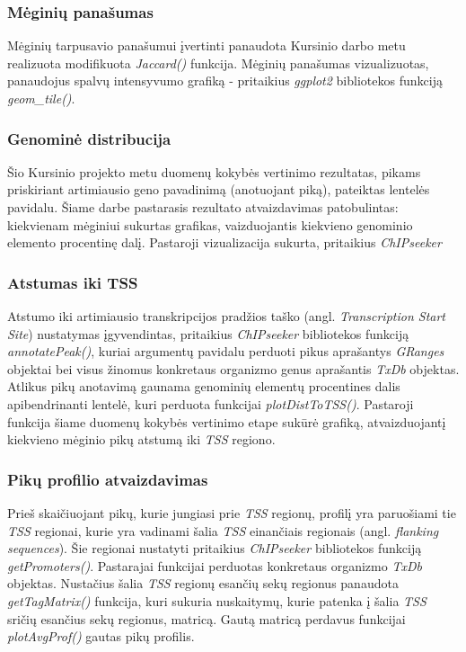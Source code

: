 \documentclass[12pt]{article}
\begin{document}
\subsubsection*{Mėginių panašumas}
Mėginių tarpusavio panašumui įvertinti panaudota Kursinio darbo metu
realizuota modifikuota \emph{Jaccard()} funkcija. Mėginių panašumas
vizualizuotas, panaudojus spalvų intensyvumo grafiką - pritaikius \emph{ggplot2}
bibliotekos funkciją \emph{geom\_tile()}.

\subsubsection*{Genominė distribucija}
Šio Kursinio projekto metu duomenų kokybės vertinimo rezultatas, pikams
priskiriant artimiausio geno pavadinimą (anotuojant piką), pateiktas
lentelės pavidalu. Šiame darbe pastarasis rezultato atvaizdavimas patobulintas:
kiekvienam mėginiui sukurtas grafikas, vaizduojantis kiekvieno genominio
elemento procentinę dalį. Pastaroji vizualizacija sukurta, pritaikius
\emph{ChIPseeker}\cite{CHIPSEEKER}

\subsubsection*{Atstumas iki TSS}
Atstumo iki artimiausio transkripcijos pradžios taško
(angl. \emph{Transcription Start Site}) nustatymas įgyvendintas, pritaikius
\emph{ChIPseeker} bibliotekos funkciją \emph{annotatePeak()}, kuriai argumentų
pavidalu perduoti pikus aprašantys \emph{GRanges} objektai bei visus žinomus
konkretaus organizmo genus aprašantis \emph{TxDb} objektas. Atlikus pikų
anotavimą gaunama genominių elementų procentines dalis apibendrinanti lentelė,
kuri perduota funkcijai \emph{plotDistToTSS()}. Pastaroji funkcija šiame duomenų
kokybės vertinimo etape sukūrė grafiką, atvaizduojantį kiekvieno mėginio pikų
atstumą iki \emph{TSS} regiono.

\subsubsection*{Pikų profilio atvaizdavimas}
Prieš skaičiuojant pikų, kurie jungiasi prie \emph{TSS} regionų, profilį yra
paruošiami tie \emph{TSS} regionai, kurie yra vadinami šalia \emph{TSS}
einančiais regionais (angl. \emph{flanking sequences}). Šie regionai nustatyti
pritaikius \emph{ChIPseeker} bibliotekos funkciją \emph{getPromoters()}.
Pastarajai funkcijai perduotas konkretaus organizmo \emph{TxDb} objektas.
Nustačius šalia \emph{TSS} regionų esančių sekų regionus panaudota
\emph{getTagMatrix()} funkcija, kuri sukuria nuskaitymų, kurie patenka į šalia
\emph{TSS} sričių esančius sekų regionus, matricą. Gautą matricą perdavus
funkcijai \emph{plotAvgProf()} gautas pikų profilis.
\end{document}
